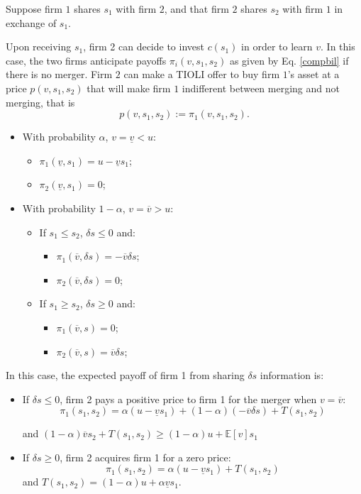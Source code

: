\documentclass[a4paper,leqno]{article}%
\newcommand{\E}{\mathbb E}
\renewcommand{\a}{\alpha}
\newcommand{\uv}{\underline{v}}
\newcommand{\ov}{\overline{v}}
\begin{document}
Suppose firm $1$ shares $s_1$ with firm $2$, and that firm $2$ shares $s_2$ with firm $1$ in exchange of $s_1$. 

Upon receiving $s_1$, firm 2 can decide to invest $c(s_1)$ in order to learn $v$. In this case, the two firms anticipate payoffs $\pi_i(v,s_1,s_2)$ as given by Eq. \eqref{compbil} if there is no merger. Firm $2$ can make a TIOLI offer to buy firm $1$'s asset at a price $p(v,s_1,s_2)$ that will make firm $1$ indifferent between merging and not merging, that is 
%
\begin{equation}\label{merger-pricebil2}
    p(v,s_1,s_2):=\pi_1(v,s_1,s_2).  
\end{equation}
%

\begin{itemize}
    \item With probability $\a$, $v=\uv<u$:
\begin{itemize}
    \item $\pi_1(\uv,s_1)=u-\uv s_1$;
    \item $\pi_2(\uv,s_1)=0$;
\end{itemize}
    \item With probability $1-\a$, $v=\ov>u$:
\begin{itemize}
    \item If $ s_1\leq s_2$, $\delta s\leq 0$ and:
\begin{itemize}
    \item $\pi_1(\ov,\delta s)=-\ov \delta s$;
    \item $\pi_2(\ov,\delta s)=0$;
\end{itemize}    
    \item If $s_1\geq s_2$, $\delta s\geq 0$ and:
\begin{itemize}
    \item $\pi_1(\ov,s)=0$;
    \item $\pi_2(\ov,s)=\ov \delta s$;
\end{itemize}
\end{itemize}
\end{itemize}

In this case, the expected payoff of firm 1 from sharing $\delta s$ information is:

\begin{itemize}
    \item If $\delta s\leq 0$, firm 2 pays a positive price to firm 1 for the merger when $v=\ov$:
    $$\pi_1(s_1,s_2)=\a(u-\uv s_1)+(1-\a)(-\ov \delta s)+T(s_1,s_2)$$
    
    and $(1-\a)\ov s_2+T(s_1,s_2) \geq (1-\a)u+\E[v]s_1$
    \item If $\delta s\geq 0$, firm 2 acquires firm 1 for a zero price:
    $$\pi_1(s_1,s_2)=\a(u-\uv s_1)+T(s_1,s_2)$$
    and $T(s_1,s_2)=(1-\a)u+\a \uv s_1$.
\end{itemize}
\end{document}
